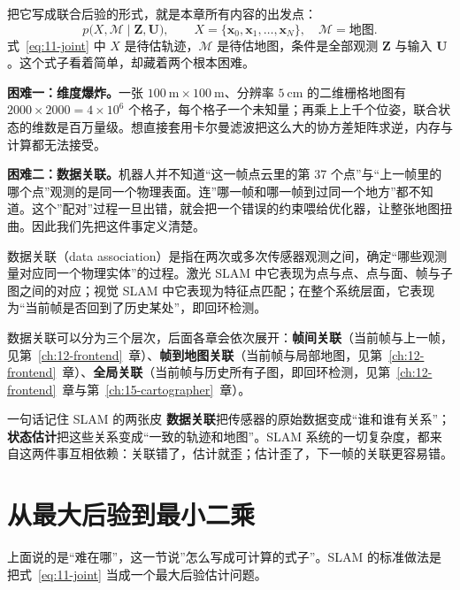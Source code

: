 把它写成联合后验的形式，就是本章所有内容的出发点：
\begin{equation}
p\big(X,\mathcal{M}\mid \bm{Z},\bm{U}\big),
\qquad X=\{\bm{x}_0,\bm{x}_1,\dots,\bm{x}_N\},\quad \mathcal{M}=\text{地图}.
\label{eq:11-joint}
\end{equation}
式~\eqref{eq:11-joint} 中 $X$ 是待估轨迹，$\mathcal{M}$ 是待估地图，条件是全部观测 $\bm{Z}$ 与输入 $\bm{U}$。这个式子看着简单，却藏着两个根本困难。

\textbf{困难一：维度爆炸。}一张 $100\ \mathrm{m}\times 100\ \mathrm{m}$、分辨率 $5\ \mathrm{cm}$ 的二维栅格地图有 $2000\times 2000=4\times 10^{6}$ 个格子，每个格子一个未知量；再乘上上千个位姿，联合状态的维数是百万量级。想直接套用卡尔曼滤波把这么大的协方差矩阵求逆，内存与计算都无法接受。

\textbf{困难二：数据关联。}机器人并不知道``这一帧点云里的第 37 个点''与``上一帧里的哪个点''观测的是同一个物理表面。连''哪一帧和哪一帧到过同一个地方''都不知道。这个''配对''过程一旦出错，就会把一个错误的约束喂给优化器，让整张地图扭曲。因此我们先把这件事定义清楚。

\begin{definition}[数据关联]
数据关联（data association）是指在两次或多次传感器观测之间，确定``哪些观测量对应同一个物理实体''的过程。激光 SLAM 中它表现为点与点、点与面、帧与子图之间的对应；视觉 SLAM 中它表现为特征点匹配；在整个系统层面，它表现为``当前帧是否回到了历史某处''，即回环检测。
\end{definition}

数据关联可以分为三个层次，后面各章会依次展开：\textbf{帧间关联}（当前帧与上一帧，见第~\ref{ch:12-frontend}~章）、\textbf{帧到地图关联}（当前帧与局部地图，见第~\ref{ch:12-frontend}~章）、\textbf{全局关联}（当前帧与历史所有子图，即回环检测，见第~\ref{ch:12-frontend}~章与第~\ref{ch:15-cartographer}~章）。

\begin{keybox}{一句话记住 SLAM 的两张皮}
\textbf{数据关联}把传感器的原始数据变成``谁和谁有关系''；\textbf{状态估计}把这些关系变成``一致的轨迹和地图''。SLAM 系统的一切复杂度，都来自这两件事互相依赖：关联错了，估计就歪；估计歪了，下一帧的关联更容易错。
\end{keybox}

\section{从最大后验到最小二乘}\label{sec:11-map}

上面说的是``难在哪''，这一节说''怎么写成可计算的式子''。SLAM 的标准做法是把式~\eqref{eq:11-joint} 当成一个最大后验估计问题。

